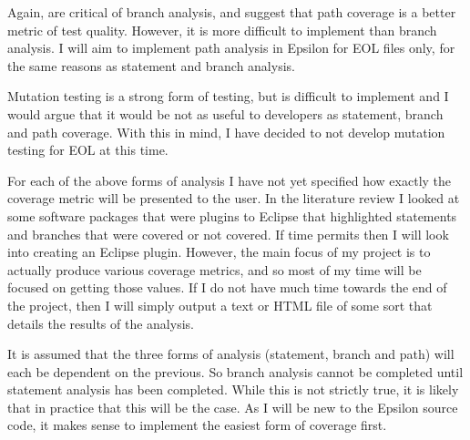 Again, \citet{Myers:2004:AST:983238} are critical of branch analysis, and suggest that path coverage is a better metric of test quality. However, it is more difficult to implement than branch analysis. I will aim to implement path analysis in Epsilon for EOL files only, for the same reasons as statement and branch analysis.

Mutation testing is a strong form of testing, but is difficult to implement and I would argue that it would be not as useful to developers as statement, branch and path coverage. With this in mind, I have decided to not develop mutation testing for EOL at this time. 


For each of the above forms of analysis I have not yet specified how exactly the coverage metric will be presented to the user. In the literature review I looked at some software packages that were plugins to Eclipse that highlighted statements and branches that were covered or not covered. If time permits then I will look into creating an Eclipse plugin. However, the main focus of my project is to actually produce various coverage metrics, and so most of my time will be focused on getting those values. If I do not have much time towards the end of the project, then I will simply output a text or HTML file of some sort that details the results of the analysis.

It is assumed that the three forms of analysis (statement, branch and path) will each be dependent on the previous. So branch analysis cannot be completed until statement analysis has been completed. While this is not strictly true, it is likely that in practice that this will be the case. As I will be new to the Epsilon source code, it makes sense to implement the easiest form of coverage first.